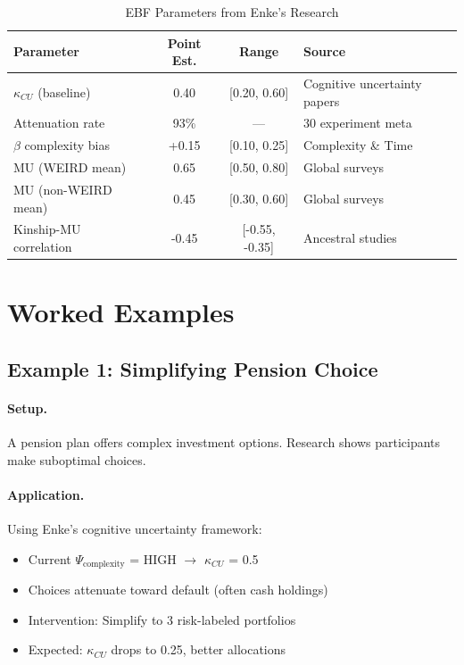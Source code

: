 \begin{table}[htbp]
\centering
\caption{EBF Parameters from Enke's Research}
\label{tab:enk-params}
\renewcommand{\arraystretch}{1.4}
\begin{tabular}{@{}lccl@{}}
\toprule
\textbf{Parameter} & \textbf{Point Est.} & \textbf{Range} & \textbf{Source} \\
\midrule
$\kappa_{CU}$ (baseline) & 0.40 & [0.20, 0.60] & Cognitive uncertainty papers \\
Attenuation rate & 93\% & --- & 30 experiment meta \\
$\beta$ complexity bias & +0.15 & [0.10, 0.25] & Complexity \& Time \\
MU (WEIRD mean) & 0.65 & [0.50, 0.80] & Global surveys \\
MU (non-WEIRD mean) & 0.45 & [0.30, 0.60] & Global surveys \\
Kinship-MU correlation & -0.45 & [-0.55, -0.35] & Ancestral studies \\
\bottomrule
\end{tabular}
\end{table}


\section{Worked Examples}
\label{sec:enk-examples}

\subsection{Example 1: Simplifying Pension Choice}

\paragraph{Setup.} A pension plan offers complex investment options.
Research shows participants make suboptimal choices.

\paragraph{Application.} Using Enke's cognitive uncertainty framework:
\begin{itemize}[nosep]
    \item Current $\Psi_{\text{complexity}}$ = HIGH $\rightarrow$ $\kappa_{CU}$ = 0.5
    \item Choices attenuate toward default (often cash holdings)
    \item Intervention: Simplify to 3 risk-labeled portfolios
    \item Expected: $\kappa_{CU}$ drops to 0.25, better allocations
\end{itemize}

